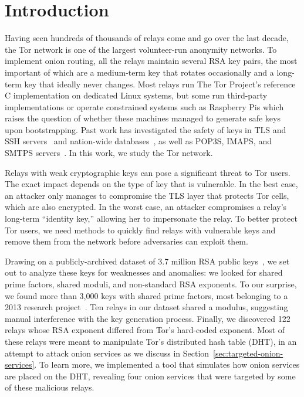 \section{Introduction}
Having seen hundreds of thousands of relays come and go over the last decade,
the Tor network is one of the largest volunteer-run anonymity networks.  To
implement onion routing, all the relays maintain several RSA key pairs, 
the most important of which are a medium-term key that rotates occasionally 
and a long-term key that ideally never changes.  
Most relays run The Tor Project's reference C
implementation on dedicated Linux systems, but some run third-party
implementations or operate constrained systems such as Raspberry Pis which
raises the question of whether these machines managed to generate safe keys
upon bootstrapping.  Past work has investigated the safety of keys in TLS and
SSH servers~\cite{Heninger2012a} and  nation-wide
databases~\cite{Bernstein2013a}, as well as POP3S, IMAPS, and SMTPS
servers~\cite{Hastings2016a}.  In this work, we study the Tor network.

Relays with weak cryptographic keys can pose a significant threat to Tor users.
The exact impact depends on the type of key that is vulnerable.  In the best
case, an attacker only manages to compromise the TLS layer that protects Tor
cells, which are also encrypted.  In the worst case, an attacker compromises a
relay's long-term ``identity key,'' allowing her to impersonate the relay.
To better protect Tor users, we need methods to quickly find relays with
vulnerable keys and remove them from the network before adversaries can exploit
them.

Drawing on a publicly-archived dataset of 3.7 million RSA public
keys~\cite{collector}, we set out to analyze these keys for weaknesses and
anomalies: we looked for shared prime factors, shared moduli, 
and non-standard RSA exponents.
To our surprise, we found more than 3,000 keys with shared prime factors, most
belonging to a 2013 research project~\cite{Biryukov2013a}.  Ten relays in
our dataset shared a modulus, suggesting manual interference with the key
generation process.  Finally, we discovered 122 relays whose RSA exponent
differed from Tor's hard-coded exponent.  Most of these relays were meant to
manipulate Tor's distributed hash table (DHT), in an attempt to attack onion
services as we discuss in Section~\ref{sec:targeted-onion-services}.  To learn
more, we implemented a tool that simulates how onion services are placed on the
DHT, revealing four onion services that were targeted by some of these malicious
relays.

